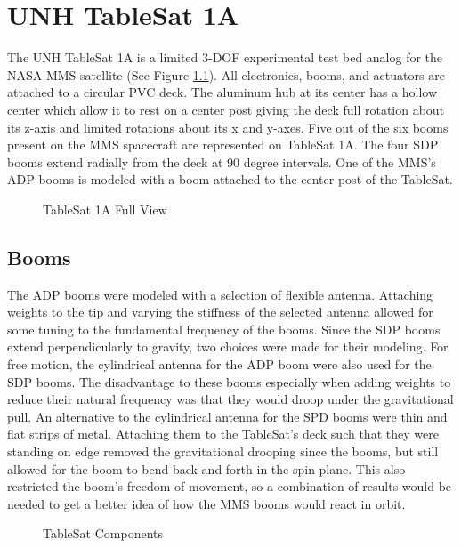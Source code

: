 
\chapter{UNH TableSat 1A}
\label{chap:UNHTableSat1A}

The UNH TableSat 1A is a limited 3-DOF experimental test bed analog for the NASA MMS satellite (See Figure \ref{fig:TSatFullView}).  All electronics, booms, and actuators are attached to a circular PVC deck.  The aluminum hub at its center has a hollow center which allow it to rest on a center post giving the deck full rotation about its z-axis and limited rotations about its x and y-axes.  Five out of the six booms present on the MMS spacecraft are represented on TableSat 1A.  The four SDP booms extend radially from the deck at 90 degree intervals.  One of the MMS's ADP booms is modeled with a boom attached to the center post of the TableSat.

\begin{figure}[H]
\centerline{}
\caption{TableSat 1A Full View}
\label{fig:TSatFullView}
\end{figure}

\section{Booms}
\label{sec:Booms}

The ADP booms were modeled with a selection of flexible antenna.  Attaching weights to the tip and varying the stiffness of the selected antenna allowed for some tuning to the fundamental frequency of the booms.  Since the SDP booms extend perpendicularly to gravity, two choices were made for their modeling.  For free motion, the cylindrical antenna for the ADP boom were also used for the SDP booms.  The disadvantage to these booms especially when adding weights to reduce their natural frequency was that they would droop under the gravitational pull.  An alternative to the cylindrical antenna for the SPD booms were thin and flat strips of metal.  Attaching them to the TableSat's deck such that they were standing on edge removed the gravitational drooping since the booms, but still allowed for the boom to bend back and forth in the spin plane.  This also restricted the boom's freedom of movement, so a combination of results would be needed to get a better idea of how the MMS booms would react in orbit.

\begin{figure}[H]
\centerline{}
\caption{TableSat Components}
\label{fig:TSatComponents}
\end{figure}


